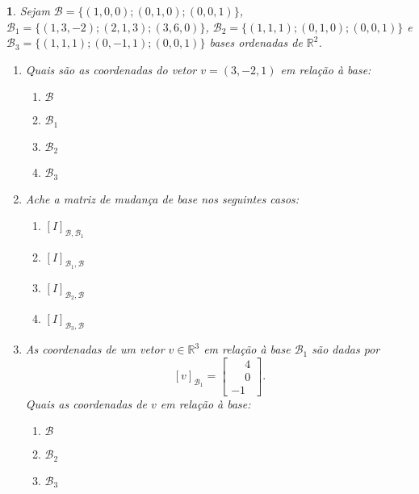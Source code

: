 \documentclass[12pt]{exam}
\newtheorem{exercicio}{}
\newcommand{\real}{\mathbb{R}}
\begin{document}
\begin{exercicio}
  Sejam $\mathcal{B} = \{(1,0,0);(0,1,0);(0,0,1)\}$, $\mathcal{B}_1 = \{(1,3,-2);(2,1,3);(3,6,0)\}$, $\mathcal{B}_2 = \{(1,1,1);(0,1,0);(0,0,1)\}$ e $\mathcal{B}_3 = \{(1,1,1);(0,-1,1);(0,0,1)\}$ bases ordenadas de $\real^2$.
  \begin{enumerate}[label=({\alph*})]
    \item Quais s\~ao as coordenadas do vetor $v = (3,-2,1)$ em rela\c{c}\~ao \`a base:
    \begin{enumerate}[label=({\roman*})]
      \item $\mathcal{B}$
      \item $\mathcal{B}_1$
      \item $\mathcal{B}_2$
      \item $\mathcal{B}_3$
    \end{enumerate}
    \item Ache a matriz de mudan\c{c}a de base nos seguintes casos:
    \begin{enumerate}[label=({\roman*})]
      \item $[I]_{\mathcal{B},\mathcal{B}_1}$
      \item $[I]_{\mathcal{B}_1,\mathcal{B}}$
      \item $[I]_{\mathcal{B}_2,\mathcal{B}}$
      \item $[I]_{\mathcal{B}_3,\mathcal{B}}$
    \end{enumerate}
    \item As coordenadas de um vetor $v \in \real^3$ em rela\c{c}\~ao \`a base $\mathcal{B}_1$ s\~ao dadas por
    \[
      [v]_{\mathcal{B}_1} = \begin{bmatrix}
        \phantom{-}4\\\phantom{-}0\\-1
      \end{bmatrix}.
    \]
    Quais as coordenadas de $v$ em rela\c{c}\~ao \`a base:
    \begin{enumerate}[label=({\roman*})]
      \item $\mathcal{B}$
      \item $\mathcal{B}_2$
      \item $\mathcal{B}_3$
    \end{enumerate}
  \end{enumerate}
\end{exercicio}
\end{document}
